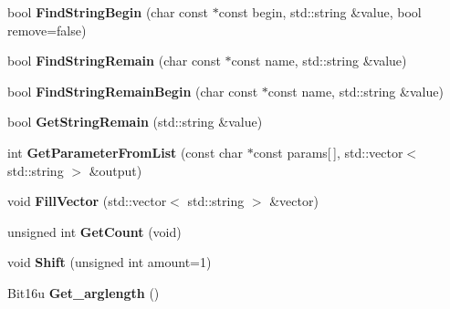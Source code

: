 \begin{DoxyCompactItemize}
\item 
\hypertarget{classCommandLine_a372efd83a11653150c7e05be677dbcae}{bool {\bfseries Find\-String\-Begin} (char const $\ast$const begin, std\-::string \&value, bool remove=false)}\label{classCommandLine_a372efd83a11653150c7e05be677dbcae}

\item 
\hypertarget{classCommandLine_a8995713eff76c14e1d53ec0515d833d6}{bool {\bfseries Find\-String\-Remain} (char const $\ast$const name, std\-::string \&value)}\label{classCommandLine_a8995713eff76c14e1d53ec0515d833d6}

\item 
\hypertarget{classCommandLine_a791da6ab1876316f66f545a31cee69e5}{bool {\bfseries Find\-String\-Remain\-Begin} (char const $\ast$const name, std\-::string \&value)}\label{classCommandLine_a791da6ab1876316f66f545a31cee69e5}

\item 
\hypertarget{classCommandLine_abdba027c787d2b5a70dee1e842c699dd}{bool {\bfseries Get\-String\-Remain} (std\-::string \&value)}\label{classCommandLine_abdba027c787d2b5a70dee1e842c699dd}

\item 
\hypertarget{classCommandLine_ac5b6c005e5f124ab3a1a7de6db8a86d3}{int {\bfseries Get\-Parameter\-From\-List} (const char $\ast$const params\mbox{[}$\,$\mbox{]}, std\-::vector$<$ std\-::string $>$ \&output)}\label{classCommandLine_ac5b6c005e5f124ab3a1a7de6db8a86d3}

\item 
\hypertarget{classCommandLine_a694f00846c0832d8cd97fe0a652d5567}{void {\bfseries Fill\-Vector} (std\-::vector$<$ std\-::string $>$ \&vector)}\label{classCommandLine_a694f00846c0832d8cd97fe0a652d5567}

\item 
\hypertarget{classCommandLine_aec22173334fc0db4e350b3475a162f1a}{unsigned int {\bfseries Get\-Count} (void)}\label{classCommandLine_aec22173334fc0db4e350b3475a162f1a}

\item 
\hypertarget{classCommandLine_aea42d5fe141ba6c58ef7045eb3b92f3e}{void {\bfseries Shift} (unsigned int amount=1)}\label{classCommandLine_aea42d5fe141ba6c58ef7045eb3b92f3e}

\item 
\hypertarget{classCommandLine_ab4e8866df99dac127353b303b95014ee}{Bit16u {\bfseries Get\-\_\-arglength} ()}\label{classCommandLine_ab4e8866df99dac127353b303b95014ee}


\end{DoxyCompactItemize}
